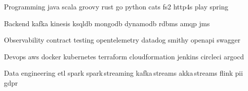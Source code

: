 
\begin{cvskills}

    \cvskill
    {Programming} %
    {java {} scala {} groovy {} rust {} go {} python {} cats {} fs2 {} http4s {} play {} spring} %

    \cvskill
    {Backend} %
    {kafka {} kinesis {} ksqldb {} mongodb {} dynamodb {} rdbms {} amqp {} jms} %

\cvskill
    {Observability} %
    {contract testing {} opentelemetry {} datadog {} smithy {} openapi {} swagger} %

    \cvskill
    {Devops} %
    {aws {} docker {} kubernetes {} terraform {} cloudformation {} jenkins {} circleci {} argocd} %

\cvskill
    {Data engineering} %
    {etl {} spark {} spark\,streaming {} kafka\,streams {} akka\,streams {} flink {} pii {} gdpr} %

\end{cvskills}
